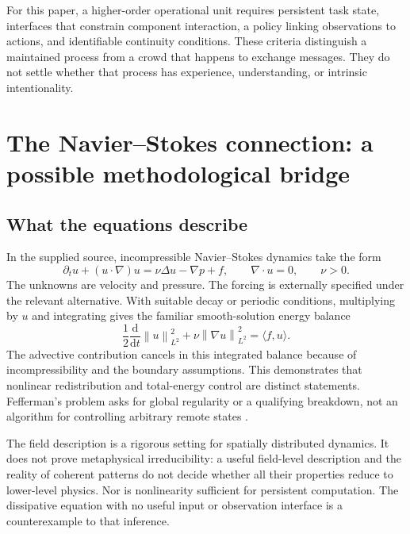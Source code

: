 \documentclass[11pt,a4paper]{article}
\theoremstyle{definition}
\theoremstyle{remark}
\newcommand{\norm}[1]{\left\lVert#1\right\rVert}
\begin{document}
For this paper, a higher-order operational unit requires persistent task state, interfaces that constrain component interaction, a policy linking observations to actions, and identifiable continuity conditions. These criteria distinguish a maintained process from a crowd that happens to exchange messages. They do not settle whether that process has experience, understanding, or intrinsic intentionality.





\section{The Navier--Stokes connection: a possible methodological bridge}\label{sec:ns}
\subsection{What the equations describe}
In the supplied source, incompressible Navier--Stokes dynamics take the form
\begin{equation}\label{eq:ns}
 \partial_t u+(u\cdot\nabla)u=\nu\Delta u-\nabla p+f,
 \qquad \nabla\cdot u=0,\qquad \nu>0.
\end{equation}
The unknowns are velocity and pressure. The forcing is externally specified under the relevant alternative. With suitable decay or periodic conditions, multiplying by $u$ and integrating gives the familiar smooth-solution energy balance
\begin{equation}\label{eq:energy}
 \frac{1}{2}\frac{\mathrm d}{\mathrm dt}\norm{u}_{L^2}^2
 +\nu\norm{\nabla u}_{L^2}^2
 =\langle f,u\rangle.
\end{equation}
The advective contribution cancels in this integrated balance because of incompressibility and the boundary assumptions. This demonstrates that nonlinear redistribution and total-energy control are distinct statements. Fefferman's problem asks for global regularity or a qualifying breakdown, not an algorithm for controlling arbitrary remote states \citep{fefferman}.

The field description is a rigorous setting for spatially distributed dynamics. It does not prove metaphysical irreducibility: a useful field-level description and the reality of coherent patterns do not decide whether all their properties reduce to lower-level physics. Nor is nonlinearity sufficient for persistent computation. The dissipative equation with no useful input or observation interface is a counterexample to that inference.
\end{document}

